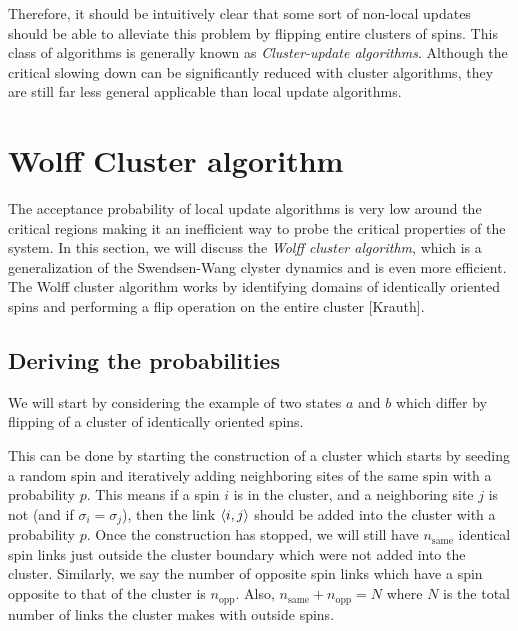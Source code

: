 \documentclass[../thesis_main.tex]{subfiles}
\begin{document}
Therefore, it should be intuitively clear that some sort of non-local updates should be able to alleviate this problem by flipping entire clusters of spins. This class of algorithms is generally known as \textit{Cluster-update algorithms}. Although the critical slowing down can be significantly reduced with cluster algorithms, they are still far less general applicable than local update algorithms.

\section{Wolff Cluster algorithm}
The acceptance probability of local update algorithms is very low around the critical regions making it an inefficient way to probe the critical properties of the system. In this section, we will discuss the \textit{Wolff cluster algorithm}, which is a generalization of the Swendsen-Wang clyster dynamics and is even more efficient. The Wolff cluster algorithm works by identifying domains of identically oriented spins and performing a flip operation on the entire cluster [Krauth].
\subsection{Deriving the probabilities}
We will start by considering the example of two states $a$ and $b$ which differ by flipping of a cluster of identically oriented spins.

This can be done by starting the construction of a cluster which starts by seeding a random spin and iteratively adding neighboring sites of the same spin with a probability $p$. This means if a spin $i$ is in the cluster, and a neighboring site $j$ is not (and if $\sigma_i = \sigma_j$), then the link $\expval{i,j}$ should be added into the cluster with a probability $p$. Once the construction has stopped, we will still have $n_\text{same}$ identical spin links just outside the cluster boundary which were not added into the cluster. Similarly, we say the number of opposite spin links which have a spin opposite to that of the cluster is $n_\text{opp}$. Also, $n_\text{same} + n_\text{opp} = N$ where $N$ is the total number of links the cluster makes with outside spins.
\end{document}

